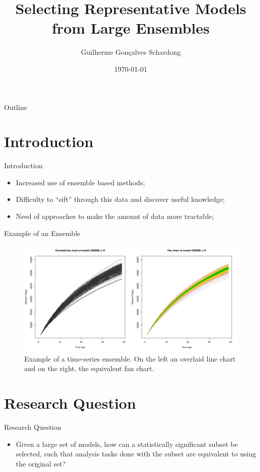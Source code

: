 \documentclass{beamer}
\title{Selecting Representative Models from Large Ensembles}
\author{Guilherme Gon\c{c}alves Schardong}
\date{\today}
\begin{document}
	
\begin{frame}
  \titlepage
\end{frame}

\begin{frame}{Outline}
  \tableofcontents
\end{frame}

\section{Introduction}
\begin{frame}{Introduction}
  \begin{itemize}
    \item Increased use of ensemble based methods;
    \item Difficulty to ``sift'' through this data and discover useful knowledge;
    \item Need of approaches to make the amount of data more tractable;
  \end{itemize}
\end{frame}

\begin{frame}{Example of an Ensemble}
  \begin{figure}
    \includegraphics[width=\columnwidth]{line-fan.pdf}
    \caption{Example of a time-series ensemble. On the left an overlaid line chart and on the right, the equivalent fan chart.}
    \label{fig:sample}
  \end{figure}
\end{frame}

\section{Research Question}
\begin{frame}{Research Question}
  \begin{itemize}
    \item Given a large set of models, how can a statistically significant subset be selected, such that analysis tasks done with the subset are equivalent to using the original set?
  \end{itemize}
\end{frame}
\end{document}
